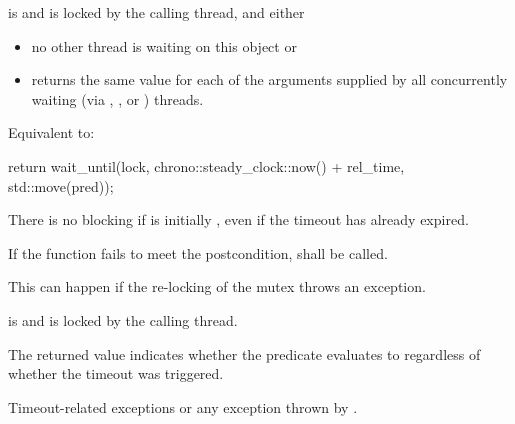 \begin{itemdescr}
\pnum
\requires {} is  and 
is locked by the calling thread, and either
\begin{itemize}
\item
no other thread is waiting on this  object or

\item
{} returns the same value for each of the  arguments
supplied by all concurrently waiting (via , , or
) threads.
\end{itemize}

\pnum
\effects Equivalent to:
\begin{codeblock}
return wait_until(lock, chrono::steady_clock::now() + rel_time, std::move(pred));
\end{codeblock}

\pnum
\begin{note} There is no blocking if  is initially , even if the
timeout has already expired. \end{note}

\pnum
\remarks
If the function fails to meet the postcondition, 
shall be called.
\begin{note} This can happen if the re-locking of the mutex throws an exception. \end{note}

\pnum
\postconditions {} is  and 
is locked by the calling thread.

\pnum
\begin{note} The returned value indicates whether the predicate evaluates to 
regardless of whether the timeout was triggered. \end{note}

\pnum
\throws Timeout-related
exceptions or any exception thrown by .

\end{itemdescr}


